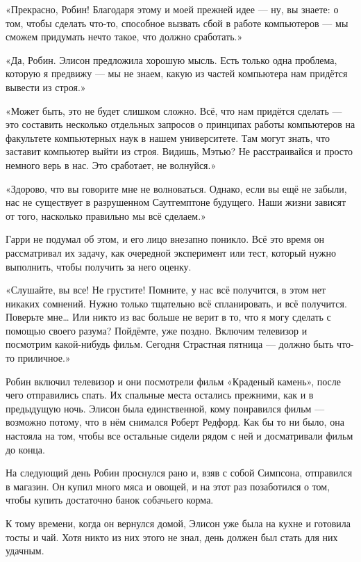 \documentclass[a5paper, 9pt,
final, openany, twoside=true]{memoir}
\begin{document}
«Прекрасно, Робин! Благодаря этому и моей прежней идее — ну, вы знаете: о том, чтобы сделать что-то, способное вызвать сбой в работе компьютеров — мы сможем придумать нечто такое, что должно сработать.»

«Да, Робин. Элисон предложила хорошую мысль. Есть только одна проблема, которую я предвижу — мы не знаем, какую из частей компьютера нам придётся вывести из строя.»

«Может быть, это не будет слишком сложно. Всё, что нам придётся сделать — это составить несколько отдельных запросов о принципах работы компьютеров на факультете компьютерных наук в нашем университете. Там могут знать, что заставит компьютер выйти из строя. Видишь, Мэтью? Не расстраивайся и просто немного верь в нас. Это сработает, не волнуйся.»

«Здорово, что вы говорите мне не волноваться. Однако, если вы ещё не забыли, нас не существует в разрушенном Саутгемптоне будущего. Наши жизни зависят от того, насколько правильно мы всё сделаем.»

Гарри не подумал об этом, и его лицо внезапно поникло. Всё это время он рассматривал их задачу, как очередной эксперимент или тест, который нужно выполнить, чтобы получить за него оценку.

«Слушайте, вы все! Не грустите! Помните, у нас всё получится, в этом нет никаких сомнений. Нужно только тщательно всё спланировать, и всё получится. Поверьте мне… Или никто из вас больше не верит в то, что я могу сделать с помощью своего разума? Пойдёмте, уже поздно. Включим телевизор и посмотрим какой-нибудь фильм. Сегодня Страстная пятница — должно быть что-то приличное.»\bigskip

Робин включил телевизор и они посмотрели фильм «Краденый камень», после чего отправились спать. Их спальные места остались прежними, как и в предыдущую ночь. Элисон была единственной, кому понравился фильм — возможно потому, что в нём снимался Роберт Редфорд. Как бы то ни было, она настояла на том, чтобы все остальные сидели рядом с ней и досматривали фильм до конца.\bigskip

На следующий день Робин проснулся рано и, взяв с собой Симпсона, отправился в магазин. Он купил много мяса и овощей, и на этот раз позаботился о том, чтобы купить достаточно банок собачьего корма.

К тому времени, когда он вернулся домой, Элисон уже была на кухне и готовила тосты и чай. Хотя никто из них этого не знал, день должен был стать для них удачным.\bigskip
\end{document}
